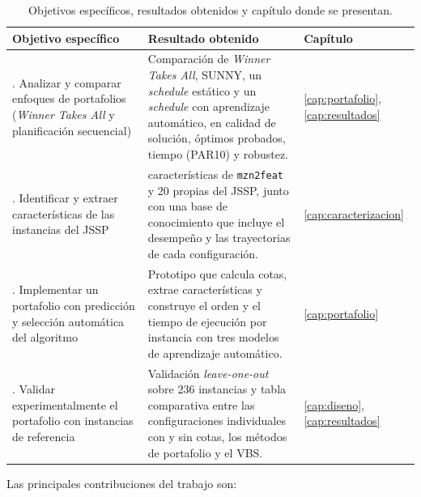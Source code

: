 \begin{table}[H]
  \centering
  \small
  \singlespacing
  \caption{Objetivos específicos, resultados obtenidos y capítulo donde se presentan.}
  \label{tab:objetivos_resultados}
  \begin{tabularx}{\textwidth}{>{\raggedright\arraybackslash}p{}
                               >{\raggedright\arraybackslash}X
                               >{\centering\arraybackslash}p{}}
    \toprule
    \textbf{Objetivo específico} & \textbf{Resultado obtenido} & \textbf{Capítulo} \\
    \midrule
    1. Analizar y comparar enfoques de portafolios (\textit{Winner Takes All} y
    planificación secuencial)
      & Comparación de \textit{Winner Takes All}, SUNNY, un \textit{schedule}
        estático y un \textit{schedule} con aprendizaje automático, en calidad
        de solución, óptimos probados, tiempo (PAR10) y robustez.
      & \ref{cap:portafolio}, \ref{cap:resultados} \\
    \addlinespace
    2. Identificar y extraer características de las instancias del JSSP
      & 65 características de \texttt{mzn2feat} y 20 propias del JSSP, junto
        con una base de conocimiento que incluye el desempeño y las
        trayectorias de cada configuración.
      & \ref{cap:caracterizacion} \\
    \addlinespace
    3. Implementar un portafolio con predicción y selección automática del
    algoritmo
      & Prototipo que calcula cotas, extrae características y construye el
        orden y el tiempo de ejecución por instancia con tres modelos de
        aprendizaje automático.
      & \ref{cap:portafolio} \\
    \addlinespace
    4. Validar experimentalmente el portafolio con instancias de referencia
      & Validación \textit{leave-one-out} sobre 236 instancias y tabla
        comparativa entre las configuraciones individuales con y sin cotas,
        los métodos de portafolio y el VBS.
      & \ref{cap:diseno}, \ref{cap:resultados} \\
    \bottomrule
  \end{tabularx}
\end{table}

Las principales contribuciones del trabajo son:

